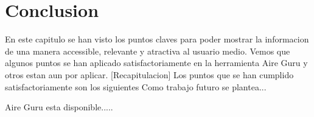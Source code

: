 \section{Conclusion}
En este capitulo se han visto los puntos claves para poder mostrar la informacion de una manera accessible,
relevante y atractiva al usuario medio. Vemos que algunos puntos se han aplicado satisfactoriamente en la herramienta
Aire Guru y otros estan aun por aplicar.
[Recapitulacion]
Los puntos que se han cumplido satisfactoriamente son los siguientes
Como trabajo futuro se plantea...
 

Aire Guru esta disponible.....